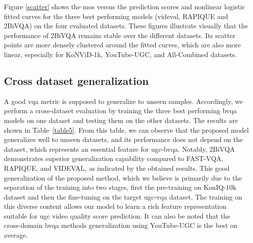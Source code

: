 \documentclass[journal]{IEEEtran}
\begin{document}
Figure \ref{scatter} shows  the \ac{mos} versus the prediction scores and nonlinear logistic fitted curves for the three best performing models (\ac{videval}, RAPIQUE and 2BiVQA) on the four evaluated datasets. These figures illustrate visually that the performance of 2BiVQA remains stable over the different datasets. Its scatter points are more densely clustered around the fitted curves, which are also more linear, especially for KoNViD-1k, YouTube-UGC, and All-Combined datasets.

\subsection{Cross dataset generalization}
A good \ac{vqa} metric is supposed to generalize to unseen samples. Accordingly, we perform a cross-dataset evaluation by training the three best performing \ac{bvqa} models on one dataset and testing them on the other datasets. The results are shown in Table~\ref{table5}. From this table, we can observe that the proposed model generalizes well to unseen datasets, and its performance does not depend on the dataset, which represents an essential feature for \ac{ugc}-\ac{bvqa}. Notably, 2BiVQA demonstrates superior generalization capability compared to FAST-VQA, RAPIQUE, and VIDEVAL, as indicated by the obtained results. This good generalization of the proposed method, which we believe is primarily due to the separation of the training into two stages, first the pre-training on KonIQ-10k dataset and then the fine-tuning on the target \ac{ugc}-\ac{vqa} dataset. The training on this diverse content allows our model to learn a rich feature representation suitable for \ac{ugc} video quality score prediction. It can also be noted that the cross-domain \ac{bvqa} methods generalization using YouTube-UGC is the best on average. 
\end{document}
